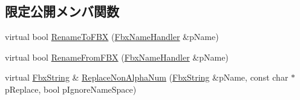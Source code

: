 \subsection*{限定公開メンバ関数}
\begin{DoxyCompactItemize}
\item 
virtual bool \hyperlink{class_fbx_renaming_strategy_aa210a797aa92ff19ab61ce5a91c86228}{Rename\+To\+F\+BX} (\hyperlink{class_fbx_name_handler}{Fbx\+Name\+Handler} \&p\+Name)
\item 
virtual bool \hyperlink{class_fbx_renaming_strategy_aefd287925863f4cbf7c1416b4bd1b419}{Rename\+From\+F\+BX} (\hyperlink{class_fbx_name_handler}{Fbx\+Name\+Handler} \&p\+Name)
\item 
virtual \hyperlink{class_fbx_string}{Fbx\+String} \& \hyperlink{class_fbx_renaming_strategy_a1dfe24b0ef385ef1b4022fd140224a78}{Replace\+Non\+Alpha\+Num} (\hyperlink{class_fbx_string}{Fbx\+String} \&p\+Name, const char $\ast$p\+Replace, bool p\+Ignore\+Name\+Space)
\end{DoxyCompactItemize}
